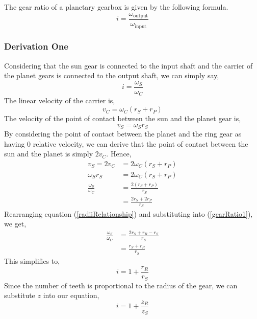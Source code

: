 \documentclass[12pt]{article}
\numberwithin{equation}{section}
\begin{document}
\begin{flushleft}
The gear ratio of a planetary gearbox is given by the following formula.
\begin{equation}
  i = \frac{\omega_{\textrm{output}}}{\omega_{\textrm{input}}}
  \label{gearRatio}
\end{equation}
\subsubsection{Derivation One}
Considering that the sun gear is connected to the input shaft and the carrier of the planet gears is connected to the output shaft, we can simply say,
\begin{equation}
  i = \frac{\omega_S}{\omega_C}
\end{equation}
The linear velocity of the carrier is,
\begin{equation}
  v_C = \omega_C (r_S + r_P)
\end{equation}
The velocity of the point of contact between the sun and the planet gear is,
\begin{equation}
  v_S = \omega_S r_S
\end{equation}
By considering the point of contact between the planet and the ring gear as having 0 relative velocity, we can derive that the point of contact between the sun and the planet is simply $2v_C$. Hence,
\begin{align}
  v_S = 2v_C &= 2\omega_C(r_S + r_P)\\
  \omega_S r_S &= 2\omega_C (r_S + r_P)\\
  \frac{\omega_S}{\omega_C} &= \frac{2(r_S + r_P)}{r_S}\\
  &= \frac{2r_S + 2r_P}{r_S} \label{gearRatio1}
\end{align}
Rearranging equation (\ref{radiiRelationship}) and substituting into (\ref{gearRatio1}), we get,
\begin{align}
  \frac{\omega_S}{\omega_C} &= \frac{2r_S + r_R - r_S}{r_S}\\
  &= \frac{r_S + r_R}{r_S}
\end{align}
This simplifies to,
\begin{equation}
  i = 1 + \frac{r_R}{r_S}
\end{equation}
Since the number of teeth is proportional to the radius of the gear, we can substitute $z$ into our equation,
\begin{equation}
  i = 1 + \frac{z_R}{z_S}
\end{equation}

\end{flushleft}
\end{document}
